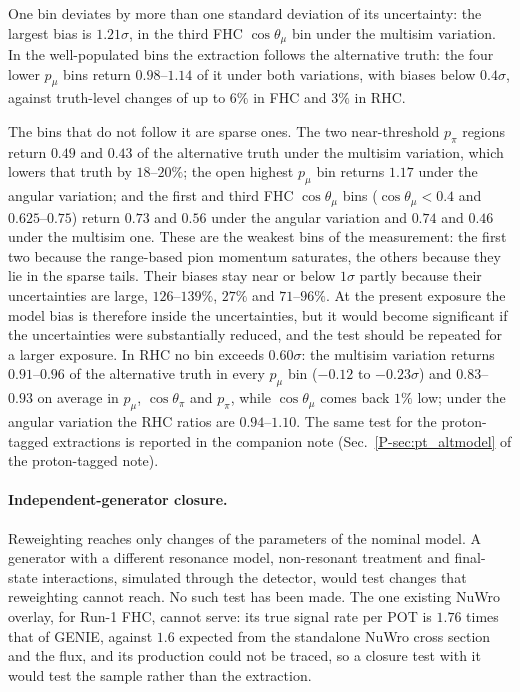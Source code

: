 \documentclass[11pt,a4paper]{article}
\newcommand{\ptref}[2]{#1~\ref{P-#2} of the proton-tagged note}
\begin{document}
One bin deviates by more than one standard deviation of its uncertainty: the largest bias is
$1.21\sigma$, in the third FHC $\cos\theta_\mu$ bin under the multisim variation. In the well-populated
bins the extraction follows the alternative truth: the four lower $p_\mu$ bins return $0.98$--$1.14$ of
it under both variations, with biases below $0.4\sigma$, against truth-level changes of up to $6\%$
in FHC and $3\%$ in RHC.

The bins that do not follow it are sparse ones. The two near-threshold $p_\pi$ regions return
$0.49$ and $0.43$ of the alternative truth under the multisim variation, which lowers that truth by
$18$--$20\%$; the open highest $p_\mu$ bin returns $1.17$ under the angular variation; and the first and
third FHC $\cos\theta_\mu$ bins ($\cos\theta_\mu<0.4$ and $0.625$--$0.75$) return $0.73$ and $0.56$
under the angular variation and $0.74$ and $0.46$ under the multisim one. These are the weakest bins
of the measurement: the first two because the range-based pion momentum saturates, the others
because they lie in the sparse tails. Their biases stay near or below
$1\sigma$ partly because their uncertainties are large, $126$--$139\%$, $27\%$ and $71$--$96\%$. At
the present exposure the model bias is therefore inside the uncertainties, but it would become
significant if the uncertainties were substantially reduced, and the test should be repeated for a
larger exposure. In RHC no bin exceeds $0.60\sigma$: the multisim variation returns $0.91$--$0.96$ of the
alternative truth in every $p_\mu$ bin ($-0.12$ to $-0.23\sigma$) and $0.83$--$0.93$ on average in $p_\mu$,
$\cos\theta_\pi$ and $p_\pi$, while $\cos\theta_\mu$ comes back $1\%$ low; under the angular variation the
RHC ratios are $0.94$--$1.10$. The same test for the proton-tagged extractions is
reported in the companion note (\ptref{Sec.}{sec:pt_altmodel}).

\paragraph{Independent-generator closure.} Reweighting reaches only changes of the parameters of the
nominal model. A generator with a different resonance model, non-resonant treatment and final-state
interactions, simulated through the detector, would test changes that reweighting cannot reach. No
such test has been made. The one existing NuWro overlay, for Run-1 FHC, cannot serve: its true signal
rate per POT is $1.76$ times that of GENIE, against $1.6$ expected from the standalone NuWro cross
section and the flux, and its production could not be traced, so a closure test with it would test
the sample rather than the extraction.
\end{document}
